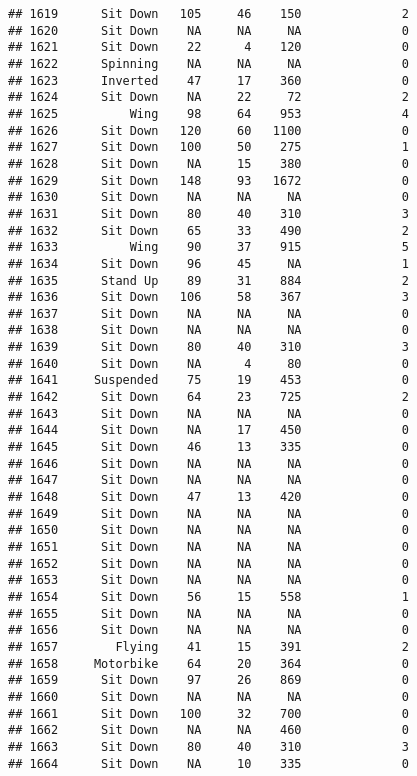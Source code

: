 \documentclass[
]{article}
\begin{document}
\begin{verbatim}
## 1619      Sit Down   105     46    150              2
## 1620      Sit Down    NA     NA     NA              0
## 1621      Sit Down    22      4    120              0
## 1622      Spinning    NA     NA     NA              0
## 1623      Inverted    47     17    360              0
## 1624      Sit Down    NA     22     72              2
## 1625          Wing    98     64    953              4
## 1626      Sit Down   120     60   1100              0
## 1627      Sit Down   100     50    275              1
## 1628      Sit Down    NA     15    380              0
## 1629      Sit Down   148     93   1672              0
## 1630      Sit Down    NA     NA     NA              0
## 1631      Sit Down    80     40    310              3
## 1632      Sit Down    65     33    490              2
## 1633          Wing    90     37    915              5
## 1634      Sit Down    96     45     NA              1
## 1635      Stand Up    89     31    884              2
## 1636      Sit Down   106     58    367              3
## 1637      Sit Down    NA     NA     NA              0
## 1638      Sit Down    NA     NA     NA              0
## 1639      Sit Down    80     40    310              3
## 1640      Sit Down    NA      4     80              0
## 1641     Suspended    75     19    453              0
## 1642      Sit Down    64     23    725              2
## 1643      Sit Down    NA     NA     NA              0
## 1644      Sit Down    NA     17    450              0
## 1645      Sit Down    46     13    335              0
## 1646      Sit Down    NA     NA     NA              0
## 1647      Sit Down    NA     NA     NA              0
## 1648      Sit Down    47     13    420              0
## 1649      Sit Down    NA     NA     NA              0
## 1650      Sit Down    NA     NA     NA              0
## 1651      Sit Down    NA     NA     NA              0
## 1652      Sit Down    NA     NA     NA              0
## 1653      Sit Down    NA     NA     NA              0
## 1654      Sit Down    56     15    558              1
## 1655      Sit Down    NA     NA     NA              0
## 1656      Sit Down    NA     NA     NA              0
## 1657        Flying    41     15    391              2
## 1658     Motorbike    64     20    364              0
## 1659      Sit Down    97     26    869              0
## 1660      Sit Down    NA     NA     NA              0
## 1661      Sit Down   100     32    700              0
## 1662      Sit Down    NA     NA    460              0
## 1663      Sit Down    80     40    310              3
## 1664      Sit Down    NA     10    335              0

\end{verbatim}
\end{document}
